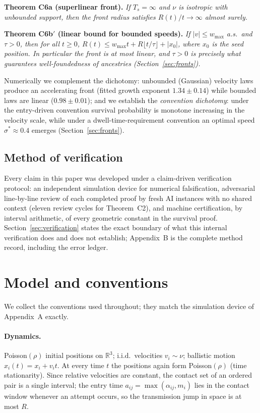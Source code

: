 \documentclass[11pt]{article}
\newenvironment{namedthm}[1]{\par\medskip\noindent\textbf{#1.}\itshape}{\par\medskip}
\newcommand{\R}{\mathbb{R}}
\newcommand{\Ts}{T_s}
\begin{document}
\begin{namedthm}{Theorem C6a (superlinear front)}
If $\Ts=\infty$ and $\nu$ is isotropic with unbounded support, then the
front radius satisfies $R(t)/t\to\infty$ almost surely.
\end{namedthm}

\begin{namedthm}{Theorem C6b$'$ (linear bound for bounded speeds)}
If $|v|\le w_{\max}$ a.s.\ and $\tau>0$, then for all $t\ge0$,
$R(t)\le w_{\max}t+R\lfloor t/\tau\rfloor+|x_0|$, where $x_0$ is the seed
position. In particular the front is at most linear, and $\tau>0$ is
precisely what guarantees well-foundedness of ancestries (Section~\ref{sec:fronts}).
\end{namedthm}

Numerically we complement the dichotomy: unbounded (Gaussian) velocity laws
produce an accelerating front (fitted growth exponent $1.34\pm0.14$) while
bounded laws are linear ($0.98\pm0.01$); and we establish the
\emph{convention dichotomy}: under the entry-driven convention survival
probability is monotone increasing in the velocity scale, while under a
dwell-time-requirement convention an optimal speed $\sigma^*\approx0.4$
emerges (Section~\ref{sec:fronts}).

\subsection*{Method of verification}
Every claim in this paper was developed under a claim-driven verification
protocol: an independent simulation device for numerical falsification,
adversarial line-by-line review of each completed proof by fresh AI
instances with no shared context (eleven review cycles for Theorem~C2), and
machine certification, by interval arithmetic, of every geometric constant in
the survival proof. Section~\ref{sec:verification} states the exact boundary
of what this internal verification does and does not establish;
Appendix~B is the complete method record, including the error ledger.

\section{Model and conventions}\label{sec:model}

We collect the conventions used throughout; they match the simulation device
of Appendix~A exactly.

\paragraph{Dynamics.} Poisson$(\rho)$ initial positions on $\R^3$;
i.i.d.\ velocities $v_i\sim\nu$; ballistic motion $x_i(t)=x_i+v_it$.
At every time $t$ the positions again form Poisson$(\rho)$ (time
stationarity). Since relative velocities are constant, the contact set of an
ordered pair is a single interval; the entry time
$a_{ij}=\max(\alpha_{ij},m_i)$ lies in the contact window whenever an attempt
occurs, so the transmission jump in space is at most $R$.
\end{document}
